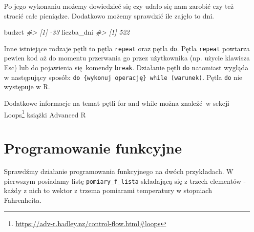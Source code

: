 \documentclass[paper=6in:9in,pagesize=pdftex,headinclude=on,footinclude=on,10pt]{scrbook}
\newenvironment{Shaded}{\begin{snugshade}}{\end{snugshade}}
\newcommand{\CommentTok}[1]{\textcolor[rgb]{0.56,0.35,0.01}{\textit{#1}}}
\newcommand{\DataTypeTok}[1]{\textcolor[rgb]{0.13,0.29,0.53}{#1}}
\newcommand{\DecValTok}[1]{\textcolor[rgb]{0.00,0.00,0.81}{#1}}
\newcommand{\KeywordTok}[1]{\textcolor[rgb]{0.13,0.29,0.53}{\textbf{#1}}}
\newcommand{\NormalTok}[1]{#1}
\newcommand{\StringTok}[1]{\textcolor[rgb]{0.31,0.60,0.02}{#1}}
\DeclareRobustCommand{\href}[2]{#2\footnote{\url{#1}}}
\let\BeginKnitrBlock\begin \let\EndKnitrBlock\end
\begin{document}
Po jego wykonaniu możemy dowiedzieć się czy udało się nam zarobić czy też stracić całe pieniądze.
Dodatkowo możemy sprawdzić ile zajęło to dni.

\begin{Shaded}
\begin{Highlighting}[]
\NormalTok{budzet}
\CommentTok{#> [1] -33}
\NormalTok{liczba_dni}
\CommentTok{#> [1] 522}
\end{Highlighting}
\end{Shaded}

\BeginKnitrBlock{rmdinfo}
Inne istniejące rodzaje pętli to pętla \texttt{repeat} oraz pętla \texttt{do}.
Pętla \texttt{repeat} powtarza pewien kod aż do momentu przerwania go przez użytkownika (np. użycie klawisza Esc) lub do pojawienia się~komendy \texttt{break}.
Działanie pętli \texttt{do} natomiast wygląda w następujący sposób:
\texttt{do\ \{wykonuj\ operację\}\ while\ (warunek)}.
Pętla \texttt{do} nie występuje w R.
\EndKnitrBlock{rmdinfo}

Dodatkowe informacje na temat pętli for and while można znaleźć~w sekcji \href{https://adv-r.hadley.nz/control-flow.html\#loops}{Loops} książki Advanced R \citep{wickham2014advanced}

\hypertarget{prog-fun}{%
\section{Programowanie funkcyjne}\label{prog-fun}}

Sprawdźmy działanie programowania funkcyjnego na dwóch przykładach.
W pierwszym posiadamy listę \texttt{pomiary\_f\_lista} składającą się z trzech elementów - każdy z nich to wektor z trzema pomiarami temperatury w stopniach Fahrenheita.

\begin{Shaded}
\end{Shaded}
\end{document}
